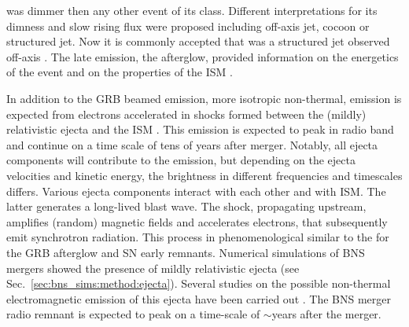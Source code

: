 \GRB{} was dimmer then any other event of its class. Different interpretations for its 
dimness and slow rising flux were proposed including off-axis jet, cocoon or structured jet. 
Now it is commonly accepted that \GRB{} was a structured jet observed off-axis 
\citep[\eg][]{Fong:2017ekk,Troja:2017nqp,Margutti:2018xqd,Lamb:2017ych,Lamb:2018ohw,Ryan:2019fhz,Alexander:2018dcl,Mooley:2018dlz,Ghirlanda:2018uyx}.
%
The \GRB{} late emission, the afterglow, provided information on the energetics of the 
event and on the properties of the \ac{ISM} \citep[\eg][]{Hajela:2019mjy}. 



In addition to the \ac{GRB} beamed emission, more isotropic non-thermal,
emission is expected from electrons accelerated in shocks formed between the 
(mildly) relativistic ejecta and the \ac{ISM} \citep{Nakar:2011cw}. This emission 
is expected to peak in radio band and continue on a time scale of tens of years 
after merger. Notably, all ejecta components will contribute to the emission, 
but depending on the ejecta velocities and kinetic energy, 
the brightness in different frequencies and timescales differs. 
%
Various ejecta components interact with each other and with \ac{ISM}. The latter 
generates a long-lived blast wave. The shock, propagating upstream, amplifies 
(random) magnetic fields and accelerates electrons, that subsequently emit 
synchrotron radiation. This process in phenomenological similar to the for the 
\ac{GRB} afterglow and \ac{SN} early remnants. 
%
Numerical simulations of \ac{BNS} mergers showed the presence of mildly relativistic 
ejecta (see Sec.~\ref{sec:bns_sims:method:ejecta}). 
Several studies on the possible non-thermal electromagnetic emission of this ejecta 
have been carried out 
\citep[\eg][]{Piran:2012wd,Hotokezaka:2015eja,Hotokezaka:2018gmo,Radice:2018pdn}. 
%
%
The \ac{BNS} merger radio remnant is expected to peak on a time-scale 
of ${\sim}$years after the merger.%
